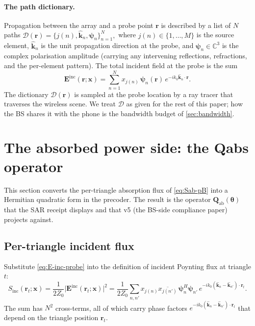 \documentclass[11pt,a4paper]{article}
\theoremstyle{definition}
\newcommand{\khat}{\hat{\bm{k}}}
\newcommand{\rr}{\mathbf{r}}
\newcommand{\EE}{\mathbf{E}}
\newcommand{\Sinc}{S_{\mathrm{inc}}}
\newcommand{\Complex}{\mathbb{C}}
\newcommand{\Qabs}{\mathbf{Q}_{\mathrm{ab}}}
\newcommand{\xvec}{\mathbf{x}}
\newcommand{\thetab}{\bm{\theta}}
\begin{document}
\paragraph{The path dictionary.}  Propagation between the array
and a probe point $\rr$ is described by a list of
$N$ paths
\(
  \mathcal{D}(\rr)=\{j(n),\khat_n,\bm\psi_n\}_{n=1}^N,
\)
where $j(n)\in\{1,\ldots,M\}$ is the source element, $\khat_n$ is
the unit propagation direction at the probe, and $\bm\psi_n\in
\Complex^3$ is the complex polarisation amplitude (carrying any
intervening reflections, refractions, and the per-element
pattern).  The total incident field at the probe is the sum
\begin{equation}\label{eq:E-inc-probe}
  \EE^{\mathrm{inc}}(\rr;\xvec)
  =\sum_{n=1}^N x_{j(n)}\,\bm\psi_n(\rr)\,
   e^{-ik_0\khat_n\cdot\rr}.
\end{equation}
The dictionary $\mathcal{D}(\rr)$ is sampled at the probe location
by a ray tracer that traverses the wireless scene.  We treat
$\mathcal{D}$ as given for the rest of this paper; how the BS
shares it with the phone is the bandwidth budget of
\cref{sec:bandwidth}.

\section{The absorbed power side: the Qabs operator}\label{sec:Qabs}

This section converts the per-triangle absorption flux of
\cref{eq:Sab-pB} into a Hermitian quadratic form in the precoder.
The result is the operator $\Qabs(\thetab)$ that the SAR receipt
displays and that v5 (the BS-side compliance paper) projects
against.

\subsection{Per-triangle incident flux}

Substitute \cref{eq:E-inc-probe} into the definition of incident
Poynting flux at triangle $t$:
\begin{equation}\label{eq:Sinc-t}
  \Sinc(\rr_t;\xvec)
  =\frac{1}{2 Z_0}\bigl|\EE^{\mathrm{inc}}(\rr_t;\xvec)\bigr|^2
  =\frac{1}{2 Z_0}\sum_{n,n'} x_{j(n)}\overline{x_{j(n')}}\,
    \bm\psi_n^H\bm\psi_{n'}\,
    e^{-ik_0(\khat_n-\khat_{n'})\cdot\rr_t}.
\end{equation}
The sum has $N^2$ cross-terms, all of which carry phase factors
$e^{-ik_0(\khat_n-\khat_{n'})\cdot\rr_t}$ that depend on the
triangle position $\rr_t$.
\end{document}
